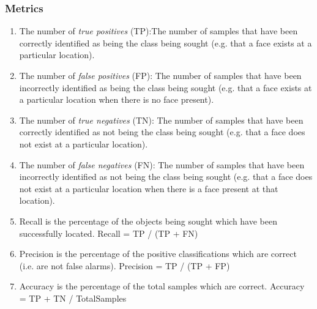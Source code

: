 \subsubsection{Metrics}

\begin{enumerate}
\item The number of \textit{true positives} (TP):The number of samples that have been correctly identified as being the class being sought (e.g. that a face exists at a particular location).
\item The number of \textit{false positives} (FP): The number of samples that have been incorrectly identified as being the class being sought (e.g. that a face exists at a particular location when there is no face present).
\item The number of \textit{true negatives} (TN): The number of samples that have been correctly identified as not being the class being sought (e.g. that a face does not exist at a particular location).
\item The number of \textit{false negatives} (FN): The number of samples that have been incorrectly identified as not being the class being sought (e.g. that a face does not exist at a particular location when there is a face present at that location).
\item Recall is the percentage of the objects being sought which have been successfully located. Recall = TP / (TP + FN)
\item Precision is the percentage of the positive classifications which are correct (i.e. are not false alarms). Precision = TP / (TP + FP)
\item Accuracy is the percentage of the total samples which are correct. Accuracy = TP + TN / TotalSamples
\end{enumerate}






